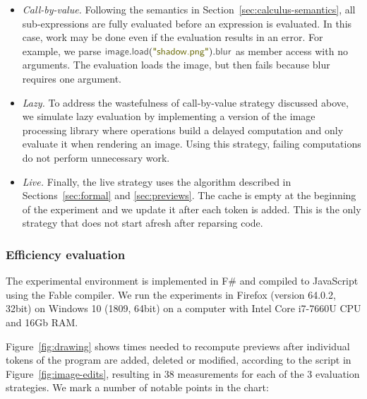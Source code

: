 \documentclass[acmsmall,anonymous,fleqn]{acmart}\settopmatter{printfolios=false,printccs=false,printacmref=false}
\theoremstyle{plain}
\theoremstyle{definition}
\newcommand{\str}[1]{\textnormal{\textcolor{strclr}{\sffamily "#1"}}}
\newcommand{\ident}[1]{\textnormal{\textcolor{idclr}{\sffamily #1}}}
\begin{document}
\begin{itemize}[itemsep=3pt]
\item \emph{Call-by-value.} Following the semantics in Section~\ref{sec:calculus-semantics},
  all sub-expressions are fully evaluated before an expression is evaluated. In this case, work may
  be done even if the evaluation results in an error. For example, we parse
  $\ident{image}.\ident{load}(\str{shadow.png}).\ident{blur}$ as member access with no arguments.
  The evaluation loads the image, but then fails because blur requires one argument.

\item \emph{Lazy.} To address the wastefulness of call-by-value strategy discussed above, we
  simulate lazy evaluation by implementing a version of the image processing library where
  operations build a delayed computation and only evaluate it when rendering an image. Using
  this strategy, failing computations do not perform unnecessary work.

\item \emph{Live.} Finally, the live strategy uses the algorithm described in
  Sections~\ref{sec:formal} and \ref{sec:previews}. The cache is empty at the beginning of the
  experiment and we update it after each token is added. This is the only strategy that does
  not start afresh after reparsing code.
\end{itemize}

\subsubsection{Efficiency evaluation}
The experimental environment is implemented in F\# and compiled to JavaScript using the Fable
compiler. We run the experiments in Firefox (version 64.0.2, 32bit) on Windows 10
(1809, 64bit) on a computer with Intel Core i7-7660U CPU and 16Gb RAM.

Figure~\ref{fig:drawing} shows times needed to recompute previews after individual tokens
of the program are added, deleted or modified, according to the script in
Figure~\ref{fig:image-edits}, resulting in 38 measurements for each of the 3
evaluation strategies. We mark a number of notable points in the chart:
\end{document}
